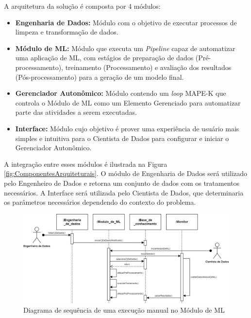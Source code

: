 \documentclass[Portugues,Final]{ic-tese-v3}
\begin{document}
A arquitetura da solução é composta por 4 módulos:

\begin{itemize}
    \item {\textbf{Engenharia de Dados:}} Módulo com o objetivo de executar processos de limpeza e transformação de dados.
	\item {\textbf{Módulo de ML:}} Módulo que executa um \textit{Pipeline} capaz de automatizar uma aplicação de ML, com estágios de preparação de dados (Pré-processamento), treinamento (Processamento) e avaliação dos resultados (Pós-processamento) para a geração de um modelo final.
     \item {\textbf{Gerenciador Autonômico:}} Módulo contendo um \textit{loop} MAPE-K que controla o Módulo de ML como um Elemento Gerenciado para automatizar parte das atividades a serem executadas.
     \item {\textbf{Interface:}} Módulo cujo objetivo é prover uma experiência de usuário mais simples e intuitiva para o Cientista de Dados para configurar e iniciar o Gerenciador Autonômico.
\end{itemize}

A integração entre esses módulos é ilustrada na Figura \ref{fig:ComponentesArquiteturais}. O módulo de Engenharia de Dados será utilizado pelo Engenheiro de Dados e retorna um conjunto de dados com os tratamentos necessários. A Interface será utilizada pelo Cientista de Dados, que determinaria os parâmetros necessários dependendo do contexto do problema. 

\begin{figure}[h]
\centering
\includegraphics[scale=0.375]{images/Diagrama_Sequencia_Manual.jpg}
\caption {Diagrama de sequência de uma execução manual no Módulo de ML}
\label{fig:DiagramaSequenciaManual}
\end{figure}
\end{document}

